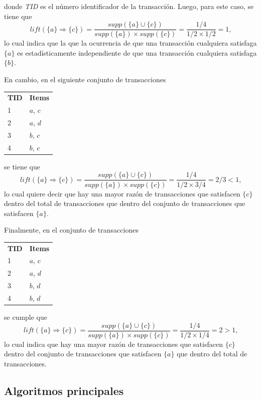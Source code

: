 donde \textit{TID} es el número identificador de la transacción. Luego, para este caso, se tiene que $$\mathit{lift}(\{a\} \Rightarrow \{c\}) = \frac{\mathit{supp}(\{a\} \cup \{c\})}{\mathit{supp}(\{a\}) \times \mathit{supp}(\{c\})} = \frac{1/4}{1/2 \times 1/2} = 1\text{,}$$ lo cual indica que la que la ocurrencia de que una transacción cualquiera satisfaga $\{a\}$ es estadísticamente independiente de que una transacción cualquiera satisfaga $\{b\}$.

En cambio, en el siguiente conjunto de transacciones

\begin{tabular}{l l}
\textbf{TID} & \textbf{Items} \\
1 & $a$, $c$ \\
2 & $a$, $d$ \\
3 & $b$, $c$ \\
4 & $b$, $c$ \\
\end{tabular}

se tiene que $$\mathit{lift}(\{a\} \Rightarrow \{c\}) = \frac{\mathit{supp}(\{a\} \cup \{c\})}{\mathit{supp}(\{a\}) \times \mathit{supp}(\{c\})} = \frac{1/4}{1/2 \times 3/4} = 2/3 < 1\text{,}$$ lo cual quiere decir que hay una mayor razón de transacciones que satisfacen $\{c\}$ dentro del total de transacciones que dentro del conjunto de transacciones que satisfacen $\{a\}$.

Finalmente, en el conjunto de transacciones

\begin{tabular}{l l}
\textbf{TID} & \textbf{Items} \\
1 & $a$, $c$ \\
2 & $a$, $d$ \\
3 & $b$, $d$ \\
4 & $b$, $d$ \\
\end{tabular}

se cumple que $$\mathit{lift}(\{a\} \Rightarrow \{c\}) = \frac{\mathit{supp}(\{a\} \cup \{c\})}{\mathit{supp}(\{a\}) \times \mathit{supp}(\{c\})} = \frac{1/4}{1/2 \times 1/4} = 2 > 1\text{,}$$ lo cual indica que hay una mayor razón de transacciones que satisfacen $\{c\}$ dentro del conjunto de transacciones que satisfacen $\{a\}$ que dentro del total de transacciones.

\subsection{Algoritmos principales}

